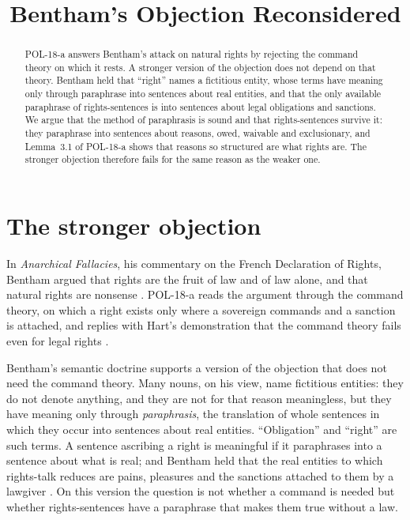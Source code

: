 \documentclass{situationist-preprint}
\title{Bentham's Objection Reconsidered}
\begin{document}
\maketitle

\begin{abstract}
POL-18-a answers Bentham's attack on natural rights by rejecting the command theory on which it rests. A stronger version of the objection does not depend on that theory. Bentham held that \enquote{right} names a fictitious entity, whose terms have meaning only through paraphrase into sentences about real entities, and that the only available paraphrase of rights-sentences is into sentences about legal obligations and sanctions. We argue that the method of paraphrasis is sound and that rights-sentences survive it: they paraphrase into sentences about reasons, owed, waivable and exclusionary, and Lemma~3.1 of POL-18-a shows that reasons so structured are what rights are. The stronger objection therefore fails for the same reason as the weaker one.
\end{abstract}

\section{The stronger objection}

In \emph{Anarchical Fallacies}, his commentary on the French Declaration of Rights, Bentham argued that rights are the fruit of law and of law alone, and that natural rights are nonsense \citep{Bentham1843}. POL-18-a reads the argument through the command theory, on which a right exists only where a sovereign commands and a sanction is attached, and replies with Hart's demonstration that the command theory fails even for legal rights \citep{Hart1982}.

Bentham's semantic doctrine supports a version of the objection that does not need the command theory. Many nouns, on his view, name fictitious entities: they do not denote anything, and they are not for that reason meaningless, but they have meaning only through \emph{paraphrasis}, the translation of whole sentences in which they occur into sentences about real entities. \enquote{Obligation} and \enquote{right} are such terms. A sentence ascribing a right is meaningful if it paraphrases into a sentence about what is real; and Bentham held that the real entities to which rights-talk reduces are pains, pleasures and the sanctions attached to them by a lawgiver \citep{Hart1982}. On this version the question is not whether a command is needed but whether rights-sentences have a paraphrase that makes them true without a law.
\end{document}
